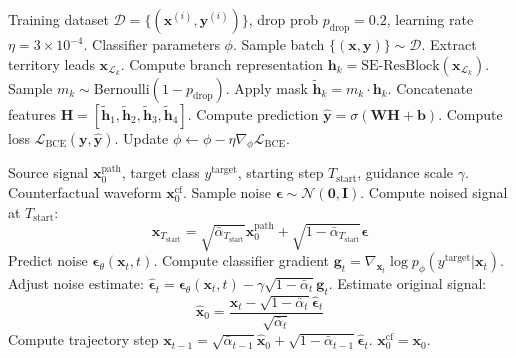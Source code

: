 \documentclass[12pt]{elsarticle}
\begin{document}
\begin{algorithm}[t]
\caption{Anatomical Territory-Dropout Classifier Training}
\label{alg:classifier_training}
\begin{algorithmic}[1]
\REQUIRE Training dataset $\mathcal{D} = \{(\mathbf{x}^{(i)}, \mathbf{y}^{(i)})\}$, drop prob $p_{\text{drop}} = 0.2$, learning rate $\eta = 3\times 10^{-4}$.
\ENSURE Classifier parameters $\phi$.
    \STATE Sample batch $\{(\mathbf{x}, \mathbf{y})\} \sim \mathcal{D}$.
        \STATE Extract territory leads $\mathbf{x}_{\mathcal{L}_k}$.
        \STATE Compute branch representation $\mathbf{h}_k = \text{SE-ResBlock}(\mathbf{x}_{\mathcal{L}_k})$.
        \STATE Sample $m_k \sim \text{Bernoulli}(1 - p_{\text{drop}})$.
        \STATE Apply mask $\tilde{\mathbf{h}}_k = m_k \cdot \mathbf{h}_k$.
    \ENDFOR
    \STATE Concatenate features $\mathbf{H} = [\tilde{\mathbf{h}}_1, \tilde{\mathbf{h}}_2, \tilde{\mathbf{h}}_3, \tilde{\mathbf{h}}_4]$.
    \STATE Compute prediction $\hat{\mathbf{y}} = \sigma(\mathbf{W} \mathbf{H} + \mathbf{b})$.
    \STATE Compute loss $\mathcal{L}_{\text{BCE}}(\mathbf{y}, \hat{\mathbf{y}})$.
    \STATE Update $\phi \leftarrow \phi - \eta \nabla_\phi \mathcal{L}_{\text{BCE}}$.
\ENDWHILE
\end{algorithmic}
\end{algorithm}

\begin{algorithm}[t]
\caption{Guided DDIM Counterfactual Inference}
\label{alg:ddim_sampling}
\begin{algorithmic}[1]
\REQUIRE Source signal $\mathbf{x}_0^{\text{path}}$, target class $y^{\text{target}}$, starting step $T_{\text{start}}$, guidance scale $\gamma$.
\ENSURE Counterfactual waveform $\mathbf{x}^{\text{cf}}_0$.
\STATE Sample noise $\mathbf{\epsilon} \sim \mathcal{N}(\mathbf{0}, \mathbf{I})$.
\STATE Compute noised signal at $T_{\text{start}}$:
       $$\mathbf{x}_{T_{\text{start}}} = \sqrt{\bar{\alpha}_{T_{\text{start}}}} \mathbf{x}_0^{\text{path}} + \sqrt{1 - \bar{\alpha}_{T_{\text{start}}}} \mathbf{\epsilon}$$
    \STATE Predict noise $\mathbf{\epsilon}_\theta(\mathbf{x}_t, t)$.
    \STATE Compute classifier gradient $\mathbf{g}_t = \nabla_{\mathbf{x}_t} \log p_\phi(y^{\text{target}} | \mathbf{x}_t)$.
    \STATE Adjust noise estimate: $\hat{\mathbf{\epsilon}}_t = \mathbf{\epsilon}_\theta(\mathbf{x}_t, t) - \gamma \sqrt{1 - \bar{\alpha}_t} \mathbf{g}_t$.
    \STATE Estimate original signal:
           $$\hat{\mathbf{x}}_0 = \frac{\mathbf{x}_t - \sqrt{1 - \bar{\alpha}_t} \hat{\mathbf{\epsilon}}_t}{\sqrt{\bar{\alpha}_t}}$$
    \STATE Compute trajectory step $\mathbf{x}_{t-1} = \sqrt{\bar{\alpha}_{t-1}} \hat{\mathbf{x}}_0 + \sqrt{1 - \bar{\alpha}_{t-1}} \hat{\mathbf{\epsilon}}_t$.
\ENDFOR
\RETURN $\mathbf{x}_0^{\text{cf}} = \mathbf{x}_0$.
\end{algorithmic}
\end{algorithm}
\end{document}
